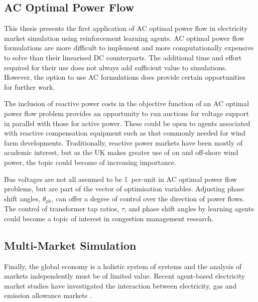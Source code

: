 
\subsection{AC Optimal Power Flow}
This thesis presents the first application of AC optimal power flow in
electricity market simulation using reinforcement learning agents.  AC optimal
power flow formulations are more difficult to implement and more computationally
expensive to solve than their linearised DC counterparts.  The
additional time and effort required for their use does not always add sufficient
value to simulations.  However, the option to use AC formulations does
provide certain opportunities for further work.

The inclusion of reactive power costs in the objective function of an AC optimal
power flow problem provides an opportunity to run auctions for voltage support
in parallel with those for active power.  These could be open to agents
associated with reactive compensation equipment such as that commonly needed for
wind farm developments.  Traditionally, reactive power markets have been mostly
of academic interest, but as the UK makes greater use of on and off-shore wind
power, the topic could become of increasing importance.

Bus voltages are not all assumed to be 1~per-unit in AC optimal power flow
problems, but are part of the vector of optimisation variables.  Adjusting
phase shift angles, $\theta_{ph}$, can offer a degree of control over
the direction of power flows.  The control of transformer tap ratios, $\tau$,
and phase shift angles by learning agents could become a topic of interest
in congestion management research.

\subsection{Multi-Market Simulation}
Finally, the global economy is a holistic system of
systems and the analysis of markets independently must be of limited value.
Recent agent-based electricity market studies have investigated the
interaction between electricity, gas and emission allowance markets
\cite{krause:gas,wang:09}.

